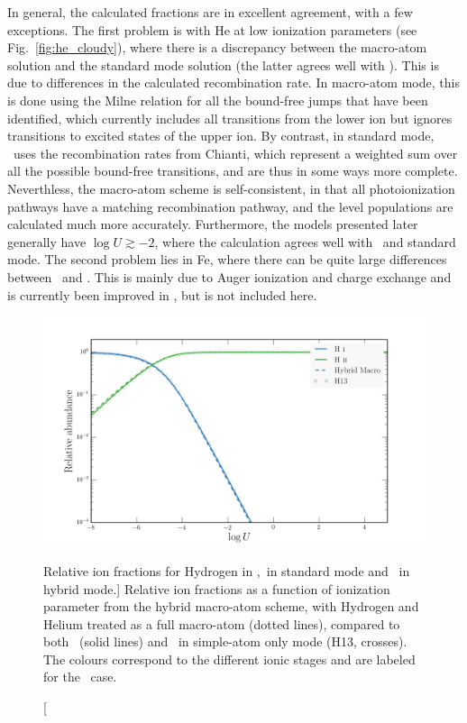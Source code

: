 In general, the calculated fractions are in excellent agreement, with a few 
exceptions. The first problem is with He at low ionization parameters 
(see Fig.~\ref{fig:he_cloudy}), where there is a discrepancy between 
the macro-atom solution and the standard mode solution 
(the latter agrees well with \cld). This is due to 
differences in the calculated recombination rate. In macro-atom mode, 
this is done using the Milne relation for all the bound-free jumps that 
have been identified, which currently includes all transitions from the lower ion but
ignores transitions to excited states of the upper ion. By contrast, 
in standard mode, \py\ uses the recombination rates from Chianti,
which represent a weighted sum over all the possible bound-free transitions,
and are thus in some ways more complete. Neverthless, the macro-atom
scheme is self-consistent, in that all photoionization pathways have a matching 
recombination pathway, and the level populations are calculated much more
accurately. Furthermore, the models presented later generally have 
$\log U \gtrsim -2$, where the calculation
agrees well with \cld\ and standard mode.
The second problem lies in Fe, where there can be quite large differences
between \py\ and \cld. This is mainly due to Auger ionization and charge 
exchange and is currently been improved in \py, but is not included here.  
\index{\cld}

\begin{figure}
\centering
\includegraphics[width=1.0\textwidth]{figures/03-radtrans/hy_comp.png}
\caption
[Relative ion fractions for Hydrogen in \cld,\py\ in standard mode and 
\py\ in hybrid mode.]
{
Relative ion fractions as a function of ionization parameter from the
hybrid macro-atom scheme, with Hydrogen and Helium 
treated as a full macro-atom (dotted lines), compared
to both \cld\ (solid lines) and \py\ in simple-atom only mode 
(H13, crosses). The colours correspond to the different ionic stages 
and are labeled for the \cld\ case.
}
\label{fig:h_cloudy}
\end{figure}

